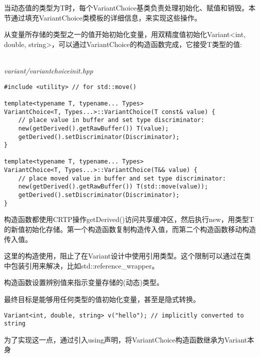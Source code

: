 

当动态值的类型为T时，每个VariantChoice基类负责处理初始化、赋值和销毁。本节通过填充VariantChoice类模板的详细信息，来实现这些操作。



从变量所存储的类型之一的值开始初始化变量，用双精度值初始化Variant<int, double, string>，可以通过VariantChoice的构造函数完成，它接受T类型的值:

\hspace*{\fill} \\ %
\noindent
\textit{variant/variantchoiceinit.hpp}
\begin{lstlisting}[style=styleCXX]
#include <utility> // for std::move()

template<typename T, typename... Types>
VariantChoice<T, Types...>::VariantChoice(T const& value) {
	// place value in buffer and set type discriminator:
	new(getDerived().getRawBuffer()) T(value);
	getDerived().setDiscriminator(Discriminator);
}

template<typename T, typename... Types>
VariantChoice<T, Types...>::VariantChoice(T&& value) {
	// place moved value in buffer and set type discriminator:
	new(getDerived().getRawBuffer()) T(std::move(value));
	getDerived().setDiscriminator(Discriminator);
}
\end{lstlisting}

构造函数都使用CRTP操作getDerived()访问共享缓冲区，然后执行new，用类型T的新值初始化存储。第一个构造函数复制构造传入值，而第二个构造函数移动构造传入值。

\begin{tcolorbox}[colback=webgreen!5!white,colframe=webgreen!75!black]
\hspace*{0.75cm}这里的构造使用，阻止了在Variant设计中使用引用类型。这个限制可以通过在类中包装引用来解决，比如std::reference\_wrapper。
\end{tcolorbox}

构造函数设置辨别值来指示变量存储的(动态)类型。

最终目标是能够用任何类型的值初始化变量，甚至是隐式转换。

\begin{lstlisting}[style=styleCXX]
Variant<int, double, string> v("hello"); // implicitly converted to string
\end{lstlisting}

为了实现这一点，通过引入using声明，将VariantChoice构造函数继承为Variant本身

